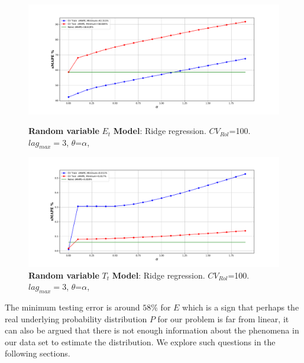 \begin{figure}[h!]
	\centering
	\begin{minipage}[b]{\textwidth}
		\includegraphics[width=\textwidth]{notebooks/data/error_sc_1_alpha.pdf}
		\caption{\textbf{Random variable} $E_{t}$ \textbf{Model}: Ridge regression. \textbf{$CV_{Rol}$}=100. $lag_{max}=3$, $\theta$=$\alpha$, }
		\label{fig:error_sc_1_alpha}
	\end{minipage}
	\hfill
	\begin{minipage}[b]{\textwidth}
		\includegraphics[width=\textwidth]{notebooks/data/trend_sc_1_alpha.pdf}
		\caption{\textbf{Random variable} $T_{t}$ \textbf{Model}: Ridge regression. \textbf{$CV_{Rol}$}=100. $lag_{max}=3$, $\theta$=$\alpha$, }  %
		\label{fig:trend_sc_1_alpha}
	\end{minipage}
\end{figure}



The minimum testing error is around $58\%$ for  $E$ which is a sign that perhaps the real underlying probability distribution $P$ for our problem is far from linear, it can also be argued that there is not enough information about the phenomena in our data set to estimate the distribution. We explore such questions in the following sections.\\




